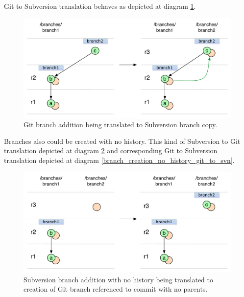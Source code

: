 Git to Subversion translation behaves as depicted at diagram \ref{branch_creation_git_to_svn}.
\begin{figure}[!h]
\centering
\renewcommand{\figurename}{Diagram}
\includegraphics[width=\linewidth]{img/diagrams/branch_creation_git_to_svn.pdf}
\caption{Git branch addition being translated to Subversion branch copy.}
\label{branch_creation_git_to_svn}
\end{figure}

Branches also could be created with no history. This kind of Subversion to Git translation depicted at diagram \ref{branch_creation_no_history_svn_to_git} and corresponding Git to Subversion translation depicted at diagram \ref{branch_creation_no_history_git_to_svn}.

\begin{figure}[!h]
\centering
\renewcommand{\figurename}{Diagram}
\includegraphics[width=\linewidth]{img/diagrams/branch_creation_no_history_svn_to_git.pdf}
\caption{Subversion branch addition with no history being translated to creation of Git branch referenced to commit with no parents.}
\label{branch_creation_no_history_svn_to_git}
\end{figure}

